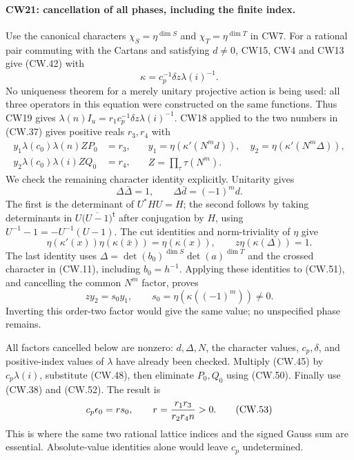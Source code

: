 \paragraph{CW21: cancellation of all phases, including the finite index.}
Use the canonical characters
$\chi_S=\eta^{\dim S}$ and $\chi_T=\eta^{\dim T}$ in CW7.
For a rational pair commuting with the Cartans and satisfying
$d\ne0$, CW15, CW4 and CW13 give (CW.42) with
\[
       \kappa=c_p^{-1}\delta z\lambda(i)^{-1}.
                                                               \tag{CW.49}
\]
No uniqueness theorem for a merely unitary projective action is
being used: all three operators in this equation were constructed
on the same functions.  Thus CW19 gives
$\lambda(n)I_u=r_1c_p^{-1}\delta z\lambda(i)^{-1}$.
CW18 applied to the two numbers in (CW.37) gives positive reals
$r_3,r_4$ with
\[
 \begin{split}
 y_1\lambda(c_0)\lambda(n)ZP_0&=r_3,\\
 y_2\lambda(c_0)\lambda(i)ZQ_0&=r_4,
 \end{split}\quad
 \begin{gathered}
 y_1=\eta(\kappa'(N^m d)),\quad
 y_2=\eta(\kappa'(N^m\Delta)),\\
 Z=\prod_\tau\tau(N^m).
 \end{gathered}                                                \tag{CW.50}
\]
We check the remaining character identity explicitly.
Unitarity gives
\[
 \Delta\bar\Delta=1,\qquad
            \Delta\bar d=(-1)^m d.                    \tag{CW.51}
\]
The first is the determinant of $U^*HU=H$; the second follows
by taking determinants in
$U\bigl(\overline{U-1}\bigr)^{\mathsf t}$ after conjugation
by $H$, using $U^{-1}-1=-U^{-1}(U-1)$.
The cut identities and norm-triviality of $\eta$ give
\[
 \eta(\kappa'(x))\eta(\kappa(\bar x))=\eta(\kappa(x)),
 \qquad z\eta(\kappa(\Delta))=1.
\]
The last identity uses
$\Delta=\det(b_0)^{\dim S}\det(a)^{\dim T}$ and the
crossed character in (CW.11), including $b_0=h^{-1}$.
Applying these identities to (CW.51), and cancelling the common
$N^m$ factor, proves
\[
              zy_2=s_0y_1,\qquad
                 s_0=\eta(\kappa((-1)^m))\ne0.         \tag{CW.52}
\]
Inverting this order-two factor would give the same value;
no unspecified phase remains.

All factors cancelled below are nonzero: $d,\Delta,N$, the
character values, $c_p,\delta$, and positive-index values of
$\lambda$ have already been checked.  Multiply (CW.45) by
$c_p\lambda(i)$, substitute (CW.48), then eliminate $P_0,Q_0$
using (CW.50).  Finally use (CW.38) and (CW.52).  The result is
\[
             c_p\epsilon_0=r s_0,\qquad
                    r={r_1r_3\over r_2r_4 n}>0.       \tag{CW.53}
\]
This is where the same two rational lattice indices and the
signed Gauss sum are essential.  Absolute-value identities alone
would leave $c_p$ undetermined.


